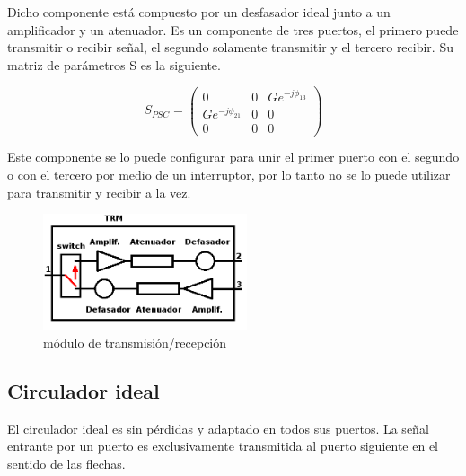 Dicho componente está compuesto por un desfasador ideal junto a un amplificador y un atenuador. Es un componente de tres puertos,
el primero puede transmitir o recibir señal, el segundo solamente transmitir y el tercero recibir. Su matriz de parámetros S es
la siguiente.

$$
	S_{PSC} = \begin{pmatrix} 0&0&Ge^{-j\phi_{13}} \\ Ge^{-j\phi_{21}}&0&0 \\ 0&0&0\end{pmatrix} 
$$

Este componente se lo puede configurar para unir el primer puerto con el segundo o con el tercero por medio de un interruptor, 
por lo tanto no se lo puede utilizar para transmitir y recibir a la vez. 

\begin{figure}[H]
 \centering
 \includegraphics[width=6cm]{gfx/trm.png}
 \caption{módulo de transmisión/recepción}
 \label{fig:trm}
\end{figure}


\subsection{Circulador ideal}

El circulador ideal es sin pérdidas y adaptado en todos sus puertos. La señal entrante por un puerto es exclusivamente
transmitida al puerto siguiente en el sentido de las flechas.

